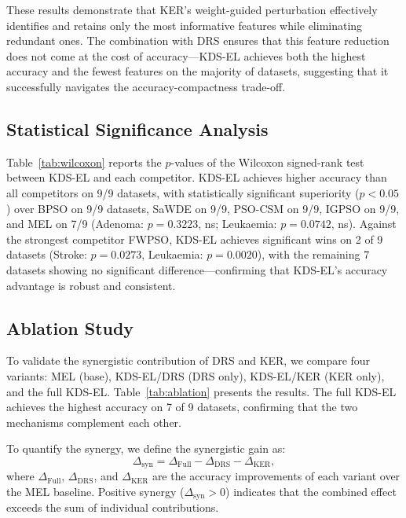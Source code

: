 \documentclass[a4paper,fleqn]{cas-dc}
\begin{document}
\begin{sloppypar}
	\par{
	These results demonstrate that KER's weight-guided perturbation
	effectively identifies and retains only the most informative
	features while eliminating redundant ones.
	The combination with DRS ensures that this feature reduction does
	not come at the cost of accuracy---KDS-EL achieves both the highest
	accuracy and the fewest features on the majority of datasets,
	suggesting that it successfully navigates the accuracy-compactness
	trade-off.
	}

	\subsection{Statistical Significance Analysis}
	\label{sec:experiments:statistical}

	\par{
	Table~\ref{tab:wilcoxon} reports the $p$-values of the Wilcoxon
	signed-rank test between KDS-EL and each competitor.
	KDS-EL achieves higher accuracy than all competitors on 9/9
	datasets, with statistically significant superiority ($p < 0.05$)
	over BPSO on 9/9 datasets, SaWDE on 9/9, PSO-CSM on 9/9, IGPSO
	on 9/9, and MEL on 7/9 (Adenoma: $p = 0.3223$, ns; Leukaemia:
	$p = 0.0742$, ns).
	Against the strongest competitor FWPSO, KDS-EL achieves significant
	wins on 2 of 9 datasets (Stroke: $p = 0.0273$, Leukaemia:
	$p = 0.0020$), with the remaining 7 datasets showing no significant
	difference---confirming that KDS-EL's accuracy advantage is
	robust and consistent.
	}

	\subsection{Ablation Study}
	\label{sec:experiments:ablation}

	\par{
	To validate the synergistic contribution of DRS and KER, we
	compare four variants: MEL (base), KDS-EL/DRS (DRS only),
	KDS-EL/KER (KER only), and the full KDS-EL.
	Table~\ref{tab:ablation} presents the results.
	The full KDS-EL achieves the highest accuracy on 7 of 9 datasets,
	confirming that the two mechanisms complement each other.
	}

	\par{
	To quantify the synergy, we define the synergistic gain as:
	\begin{equation}
		\Delta_{\mathrm{syn}} = \Delta_{\mathrm{Full}}
		- \Delta_{\mathrm{DRS}} - \Delta_{\mathrm{KER}},
		\label{eq:synergy}
	\end{equation}
	where $\Delta_{\mathrm{Full}}$, $\Delta_{\mathrm{DRS}}$, and
	$\Delta_{\mathrm{KER}}$ are the accuracy improvements of each
	variant over the MEL baseline.
	Positive synergy ($\Delta_{\mathrm{syn}} > 0$) indicates that
	the combined effect exceeds the sum of individual contributions.
	}


\end{sloppypar}
\end{document}
